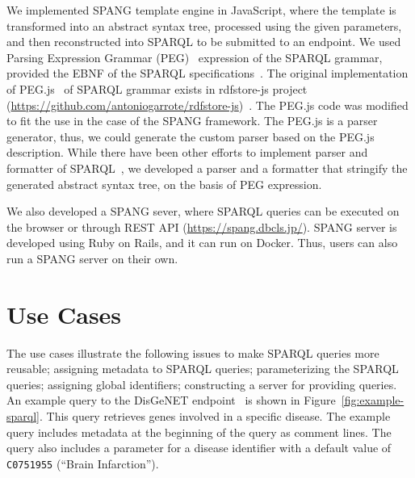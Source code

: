 \documentclass[runningheads]{llncs}
\begin{document}
We implemented SPANG template engine in JavaScript, where the template is transformed into an abstract syntax tree, processed using the given parameters, and then reconstructed into SPARQL to be submitted to an endpoint. 
We used Parsing Expression Grammar (PEG)~\cite{peg} expression of the SPARQL grammar, provided the EBNF of the SPARQL specifications~\cite{sparql}. The original implementation of PEG.js~\cite{pegjs} of SPARQL grammar exists in rdfstore-js project (\url{https://github.com/antoniogarrote/rdfstore-js})~\cite{rdfstore-js}.
The PEG.js code was modified to fit the use in the case of the SPANG framework.
The PEG.js is a parser generator, thus, we could generate the custom parser based on the PEG.js description. 
While there have been other efforts to implement parser and formatter of SPARQL~\cite{sparql-js}, we developed a parser and a formatter that stringify the generated abstract syntax tree, on the basis of PEG expression. %

We also developed a SPANG sever, where SPARQL queries can be executed on the browser or through REST API (\url{https://spang.dbcls.jp/}).
SPANG server is developed using Ruby on Rails, and it can run on Docker.
Thus, users can also run a SPANG server on their own. 

\section{Use Cases}
The use cases illustrate the following issues to make SPARQL queries more reusable;
assigning metadata to SPARQL queries;
parameterizing the SPARQL queries;
assigning global identifiers;
constructing a server for providing queries.
An example query to the DisGeNET endpoint~\cite{disgenet} is shown in Figure~\ref{fig:example-sparql}.
This query retrieves genes involved in a specific disease.
The example query includes metadata at the beginning of the query as comment lines.
The query also includes a parameter for a disease identifier with a default value of \texttt{C0751955} (``Brain Infarction'').
\end{document}
